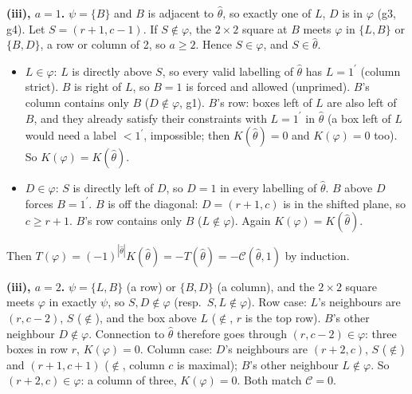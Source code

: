 \documentclass[10pt]{amsart}
\newcommand{\cC}{\mathcal{C}}
\newcommand{\pr}{^{\prime}}
\theoremstyle{remark}
\begin{document}
\textbf{(iii), $a=1$.} $\psi=\{B\}$ and $B$ is adjacent to $\hat\theta$, so exactly one of $L$, $D$ is in $\varphi$ (g3,
g4). Let $S=(r+1,c-1)$. If $S\notin\varphi$, the $2\times2$ square at $B$ meets $\varphi$ in $\{L,B\}$ or $\{B,D\}$, a row or
column of 2, so $a\ge2$. Hence $S\in\varphi$, and $S\in\hat\theta$.
\begin{itemize}
\item $L\in\varphi$: $L$ is directly above $S$, so every valid labelling of $\hat\theta$ has $L=1\pr$ (column strict). $B$ is
right of $L$, so $B=1$ is forced and allowed (unprimed). $B$'s column contains only $B$ ($D\notin\varphi$, g1). $B$'s row:
boxes left of $L$ are also left of $B$, and they already satisfy their constraints with $L=1\pr$ in $\hat\theta$ (a box left
of $L$ would need a label $<1\pr$, impossible; then $K(\hat\theta)=0$ and $K(\varphi)=0$ too). So $K(\varphi)=K(\hat\theta)$.
\item $D\in\varphi$: $S$ is directly left of $D$, so $D=1$ in every labelling of $\hat\theta$. $B$ above $D$ forces $B=1\pr$.
$B$ is off the diagonal: $D=(r+1,c)$ is in the shifted plane, so $c\ge r+1$. $B$'s row contains only $B$ ($L\notin\varphi$).
Again $K(\varphi)=K(\hat\theta)$.
\end{itemize}
Then $T(\varphi)=(-1)^{|\hat\theta|}K(\hat\theta)=-T(\hat\theta)=-\cC(\hat\theta,1)$ by induction. \checkmark

\textbf{(iii), $a=2$.} $\psi=\{L,B\}$ (a row) or $\{B,D\}$ (a column), and the $2\times2$ square meets $\varphi$ in exactly
$\psi$, so $S,D\notin\varphi$ (resp.\ $S,L\notin\varphi$). Row case: $L$'s neighbours are $(r,c-2)$, $S$ ($\notin$), and the
box above $L$ ($\notin$, $r$ is the top row). $B$'s other neighbour $D\notin\varphi$. Connection to $\hat\theta$ therefore
goes through $(r,c-2)\in\varphi$: three boxes in row $r$, $K(\varphi)=0$. Column case: $D$'s neighbours are $(r+2,c)$, $S$
($\notin$) and $(r+1,c+1)$ ($\notin$, column $c$ is maximal); $B$'s other neighbour $L\notin\varphi$. So $(r+2,c)\in\varphi$: a
column of three, $K(\varphi)=0$. Both match $\cC=0$. \checkmark
\end{document}
